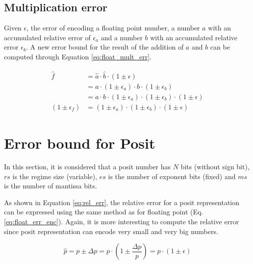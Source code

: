 \subsection{Multiplication error}
Given $\epsilon$, the error of encoding a floating point number, a number $a$ with an accumulated relative error of $\epsilon_a$ and a number $b$ with an accumulated relative error $\epsilon_b$. A new error bound for the result of the addition of $a$ and $b$ can be computed through Equation \ref{eq:float_mult_err}.

\begin{align}
\begin{split}
\hat{f} &= \hat{a} \cdot \hat{b} \cdot (1 \pm \epsilon)\\
		&= a \cdot (1 \pm \epsilon_a) \cdot b \cdot (1 \pm \epsilon_b)\\
		&= a \cdot b \cdot (1 \pm \epsilon_a) \cdot (1 \pm \epsilon_b) \cdot (1 \pm \epsilon)\\
(1 \pm \epsilon_f) &= (1 \pm \epsilon_a) \cdot (1 \pm \epsilon_b) \cdot (1 \pm \epsilon)
\end{split}
\label{eq:float_mult_err}
\end{align}

\section{Error bound for Posit}
In this section, it is considered that a posit number has $N$ bits (without sign bit), $rs$ is the regime size (variable), $es$ is the number of exponent bits (fixed) and $ms$ is the number of mantissa bits.

As shown in Equation \ref{eq:rel_err}, the relative error for a posit representation can be expressed using the same method as for floating point (Eq. \ref{eq:float_err_enc}). Again, it is more interesting to compute the relative error since posit representation can encode very small and very big numbers.

\begin{equation}
	\hat{p} = p \pm \Delta p = p \cdot \left(1 \pm \frac{\Delta p}{p}\right) = p \cdot (1 \pm \epsilon)
	\label{eq:rel_err}
\end{equation}

